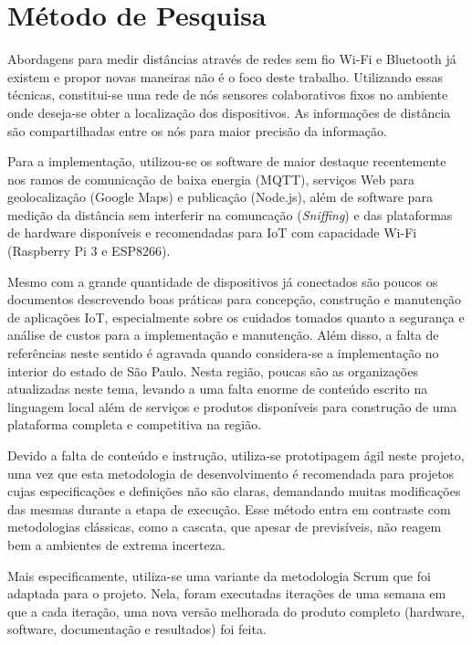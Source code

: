 
\chapter{Método de Pesquisa}
\label{chap:Método de Pesquisa}

Abordagens para medir distâncias através de redes sem fio Wi-Fi
\cite{bahillo2009ieee} e Bluetooth já existem e propor novas maneiras
não é o foco deste trabalho. Utilizando essas técnicas, constitui-se uma
rede de nós sensores colaborativos fixos no ambiente onde deseja-se obter a
localização dos dispositivos. As informações de distância são compartilhadas
entre os nós para maior precisão da informação.

Para a implementação, utilizou-se os software de maior
destaque recentemente nos ramos de comunicação de baixa energia (MQTT),
serviços Web para geolocalização (Google Maps) e publicação
(Node.js), além de software para medição da distância sem
interferir na comuncação (\emph{Sniffing}) e das plataformas de
hardware disponíveis e recomendadas para IoT com capacidade
Wi-Fi (Raspberry Pi 3 e ESP8266).

Mesmo com a grande quantidade de dispositivos já conectados são poucos os
documentos descrevendo boas práticas para concepção, construção e manutenção de
aplicações IoT, especialmente sobre os cuidados tomados quanto a segurança e
análise de custos para a implementação e manutenção. Além
disso, a falta de referências neste sentido é agravada quando considera-se a
implementação no interior do estado de São Paulo. Nesta região, poucas são as
organizações atualizadas neste tema, levando a uma falta enorme de conteúdo
escrito na linguagem local além de serviços e produtos disponíveis para
construção de uma plataforma completa e competitiva na região.

Devido a falta de conteúdo e instrução, utiliza-se prototipagem ágil neste
projeto, uma vez que esta metodologia de desenvolvimento é recomendada para
projetos cujas especificações e definições não são claras, demandando muitas
modificações das mesmas durante a etapa de execução. Esse método entra em
contraste com metodologias clássicas, como a cascata, que apesar de previsíveis,
não reagem bem a ambientes de extrema incerteza.

Mais especificamente, utiliza-se uma variante da metodologia Scrum
\cite{James2016} que foi adaptada para o projeto. Nela, foram executadas
iterações de uma semana em que a cada iteração, uma nova versão melhorada do
produto completo (hardware, software, documentação e
resultados) foi feita.

